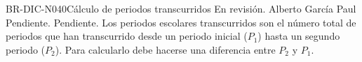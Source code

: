 \begin{BusinessRule}{BR-DIC-N040}{Cálculo de periodos transcurridos}
	{\bcCondition} %
	{\btTimer}     %
	{\blInfluencing}     %
	\BRItem[Estado] En revisión.
	  Alberto García Paul
	 Pendiente.
	 Pendiente.
	\BRItem[Descripción] Los periodos escolares transcurridos son el número total de periodos que han transcurrido desde un periodo inicial ($P_{1}$) hasta un segundo periodo ($P_{2}$). Para calcularlo debe hacerse una diferencia entre $P_{2}$ y $P_{1}$.  \\
	

\end{BusinessRule}
